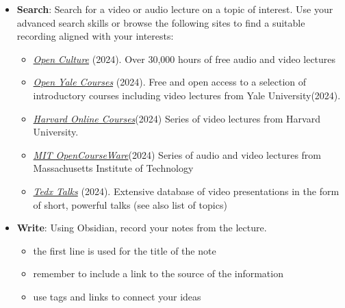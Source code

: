 \documentclass[
  letterpaper,
  DIV=11,
  numbers=noendperiod]{scrreprt}
\providecommand{\tightlist}{%
  \setlength{\itemsep}{0pt}\setlength{\parskip}{0pt}}\usepackage{longtable,booktabs,array}
\begin{document}
\begin{tcolorbox}[enhanced jigsaw, toprule=.15mm, colback=white, colframe=quarto-callout-note-color-frame, bottomtitle=1mm, leftrule=.75mm, coltitle=black, titlerule=0mm, rightrule=.15mm, colbacktitle=quarto-callout-note-color!10!white, left=2mm, title={Learning Activity}, opacitybacktitle=0.6, opacityback=0, breakable, toptitle=1mm, arc=.35mm, bottomrule=.15mm]

\begin{itemize}
\tightlist
\item
  \textbf{Search}: Search for a video or audio lecture on a topic of
  interest. Use your advanced search skills or browse the following
  sites to find a suitable recording aligned with your interests:

  \begin{itemize}
  \tightlist
  \item
    \href{https://www.openculture.com/freeonlinecourses}{\emph{Open
    Culture}} (2024). Over 30,000 hours of free audio and video lectures
  \item
    \href{https://oyc.yale.edu/}{\emph{Open Yale Courses}} (2024). Free
    and open access to a selection of introductory courses including
    video lectures from Yale University(2024).
  \item
    \href{https://extension.harvard.edu/online-learning/}{\emph{Harvard
    Online Courses}}(2024) Series of video lectures from Harvard
    University.
  \item
    \href{https://ocw.mit.edu/search/?f=Lecture\%20Videos&f=Lecture\%20Audio&s=department_course_numbers.sort_coursenum}{\emph{MIT
    OpenCourseWare}}(2024) Series of audio and video lectures from
    Massachusetts Institute of Technology
  \item
    \href{https://www.ted.com/}{\emph{Tedx Talks}} (2024). Extensive
    database of video presentations in the form of short, powerful talks
    (see also list of topics)
  \end{itemize}
\item
  \textbf{Write}: Using Obsidian, record your notes from the lecture.

  \begin{itemize}
  \tightlist
  \item
    the first line is used for the title of the note
  \item
    remember to include a link to the source of the information
  \item
    use tags and links to connect your ideas
  \end{itemize}
\end{itemize}

\end{tcolorbox}
\end{document}
